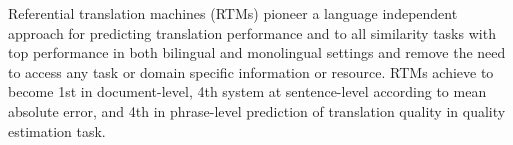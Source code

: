 Referential translation machines (RTMs) pioneer a language independent approach for predicting translation performance and to all similarity tasks with top performance in both bilingual and monolingual settings and remove the need to access any task or domain specific information or resource. RTMs achieve to become 1st in document-level, 4th system at sentence-level according to mean absolute error, and 4th in phrase-level prediction of translation quality in quality estimation task.
